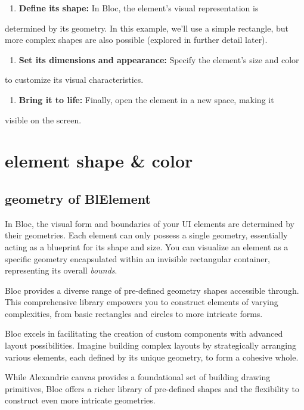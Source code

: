 \documentclass[10pt,twoside,english]{_support/latex/sbabook/sbabook}
\begin{document}
\begin{enumerate}
    \item \textbf{Define its shape:} In Bloc, the element's visual representation is
\end{enumerate}

determined by its geometry. In this example, we'll use a simple rectangle, but
more complex shapes are also possible (explored in further detail later).

\begin{enumerate}
    \item \textbf{Set its dimensions and appearance:} Specify the element's size and color
\end{enumerate}

to customize its visual characteristics.

\begin{enumerate}
    \item \textbf{Bring it to life:} Finally, open the element in a new space, making it
\end{enumerate}

visible on the screen.

\chapter{element shape \& color}
\section{geometry of BlElement}
In Bloc, the visual form and boundaries of your UI elements are determined by
their geometries. Each element can only possess a single geometry, essentially
acting as a blueprint for its shape and size. You can visualize an element as a
specific geometry encapsulated within an invisible rectangular container,
representing its overall \textit{bounds}.

Bloc provides a diverse range of pre-defined geometry shapes accessible through. This comprehensive library empowers you to
construct elements of varying complexities, from basic rectangles and circles to
more intricate forms.

Bloc excels in facilitating the creation of custom components with advanced
layout possibilities. Imagine building complex layouts by strategically
arranging various elements, each defined by its unique geometry, to form a
cohesive whole.

While Alexandrie canvas provides a foundational set of building drawing
primitives, Bloc offers a richer library of pre-defined shapes and the
flexibility to construct even more intricate geometries.
\end{document}
